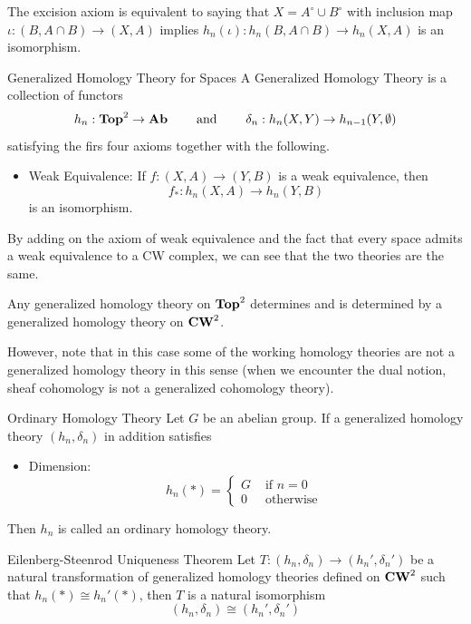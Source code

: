 \documentclass[a4paper]{article}
\begin{document}
\begin{lmm}{}{} The excision axiom is equivalent to saying that $X=A^\circ\cup B^\circ$ with inclusion map $\iota:(B,A\cap B)\to (X,A)$ implies $h_n(\iota):h_n(B,A\cap B)\to h_n(X,A)$ is an isomorphism. 
\end{lmm}

\begin{defn}{Generalized Homology Theory for Spaces}{} A Generalized Homology Theory is a collection of functors $$h_n:\bold{Top}^2\to\bold{Ab}\;\;\;\;\;\;\;\text{ and }\;\;\;\;\;\;\;\delta_n:h_n(X,Y)\to h_{n-1}(Y,\emptyset)$$ satisfying the firs four axioms together with the following. 
\begin{itemize}
\item Weak Equivalence: If $f:(X,A)\to(Y,B)$ is a weak equivalence, then $$f_\ast:h_n(X,A)\to h_n(Y,B)$$ is an isomorphism. 
\end{itemize}
\end{defn}

By adding on the axiom of weak equivalence and the fact that every space admits a weak equivalence to a CW complex, we can see that the two theories are the same. 

\begin{thm}{}{} Any generalized homology theory on $\bold{Top}^2$ determines and is determined by a generalized homology theory on $\bold{CW}^2$.
\end{thm}

However, note that in this case some of the working homology theories are not a generalized homology theory in this sense (when we encounter the dual notion, sheaf cohomology is not a generalized cohomology theory). 

\begin{defn}{Ordinary Homology Theory}{} Let $G$ be an abelian group. If a generalized homology theory $(h_n,\delta_n)$ in addition satisfies 
\begin{itemize}
\item Dimension: $$h_n(\ast)=\begin{cases}
G & \text{ if } n=0\\
0 & \text{ otherwise }
\end{cases}$$
\end{itemize}
Then $h_n$ is called an ordinary homology theory. 
\end{defn}

\begin{thm}{Eilenberg-Steenrod Uniqueness Theorem}{} Let $T:(h_n,\delta_n)\to(h_n',\delta_n')$ be a natural transformation of generalized homology theories defined on $\bold{CW}^2$ such that $h_n(\ast)\cong h_n'(\ast)$, then $T$ is a natural isomorphism $$(h_n,\delta_n)\cong(h_n',\delta_n')$$
\end{thm}
\end{document}

